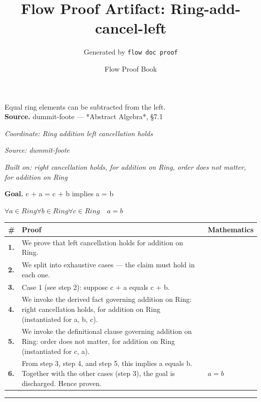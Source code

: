 \documentclass[11pt]{article}
\title{Flow Proof Artifact: Ring-add-cancel-left}
\author{Generated by \texttt{flow doc proof}}
\date{Flow Proof Book}
\theoremstyle{definition}
\begin{document}
\maketitle
Equal ring elements can be subtracted from the left.\\[0.5em]
\textbf{Source.} dummit-foote — *Abstract Algebra*, §7.1\\[0.5em]
\bigskip
{}\par
\smallskip\noindent\textit{Coordinate: Ring \cdot addition \cdot left cancellation holds}\par
\smallskip\noindent\textit{Source: dummit-foote}\par
\smallskip\noindent\textit{Built on: right cancellation holds, for addition on Ring, order does not matter, for addition on Ring}\par
\medskip
\noindent\textbf{Goal.} c + a = c + b implies a = b\par
\noindent$\displaystyle \forall a \in Ring \forall b \in Ring \forall c \in Ring\quad a = b$\par
\medskip
\noindent
\begin{tabular}{@{} >{\raggedright\arraybackslash}p{} >{\raggedright\arraybackslash}p{} >{\raggedleft\arraybackslash}p{} @{}}
\textbf{\#} & \textbf{Proof} & \textbf{Mathematics} \\
\midrule
\textbf{1.} & We prove that left cancellation holds for addition on Ring. & \\[0.45em]
\textbf{2.} & We split into exhaustive cases — the claim must hold in each one. & \\[0.45em]
\textbf{3.} & Case 1 (see step 2): suppose c + a  equals  c + b. & \\[0.45em]
\textbf{4.} & We invoke the derived fact governing addition on Ring: right cancellation holds, for addition on Ring (instantiated for a, b, c). & \\[0.45em]
\textbf{5.} & We invoke the definitional clause governing addition on Ring: order does not matter, for addition on Ring (instantiated for c, a). & \\[0.45em]
\textbf{6.} & From step 3, step 4, and step 5, this implies a equals b. Together with the other cases (step 3), the goal is discharged. Hence proven. & $\displaystyle a = b$ \\[0.45em]
\bottomrule
\end{tabular}
\label{thm:Ring-addition-left_cancellation_holds}
\par\medskip\hrule
\end{document}
